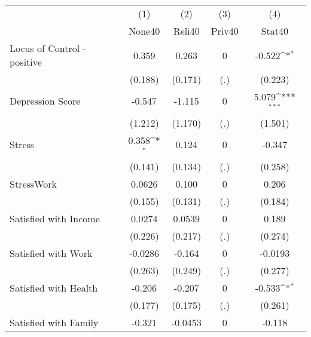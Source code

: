 {
\def\sym#1{\ifmmode^{#1}\else\(^{#1}\)\fi}
\begin{tabular}{l*{4}{c}}
\hline\hline
            &\multicolumn{1}{c}{(1)}&\multicolumn{1}{c}{(2)}&\multicolumn{1}{c}{(3)}&\multicolumn{1}{c}{(4)}\\
            &\multicolumn{1}{c}{None40}&\multicolumn{1}{c}{Reli40}&\multicolumn{1}{c}{Priv40}&\multicolumn{1}{c}{Stat40}\\
\hline
Locus of Control - positive&       0.359         &       0.263         &           0         &      -0.522\sym{*}  \\
            &     (0.188)         &     (0.171)         &         (.)         &     (0.223)         \\
[1em]
Depression Score&      -0.547         &      -1.115         &           0         &       5.079\sym{***}\\
            &     (1.212)         &     (1.170)         &         (.)         &     (1.501)         \\
[1em]
Stress      &       0.358\sym{*}  &       0.124         &           0         &      -0.347         \\
            &     (0.141)         &     (0.134)         &         (.)         &     (0.258)         \\
[1em]
StressWork  &      0.0626         &       0.100         &           0         &       0.206         \\
            &     (0.155)         &     (0.131)         &         (.)         &     (0.184)         \\
[1em]
Satisfied with Income&      0.0274         &      0.0539         &           0         &       0.189         \\
            &     (0.226)         &     (0.217)         &         (.)         &     (0.274)         \\
[1em]
Satisfied with Work&     -0.0286         &      -0.164         &           0         &     -0.0193         \\
            &     (0.263)         &     (0.249)         &         (.)         &     (0.277)         \\
[1em]
Satisfied with Health&      -0.206         &      -0.207         &           0         &      -0.533\sym{*}  \\
            &     (0.177)         &     (0.175)         &         (.)         &     (0.261)         \\
[1em]
Satisfied with Family&      -0.321         &     -0.0453         &           0         &      -0.118         \\

\end{tabular}}
